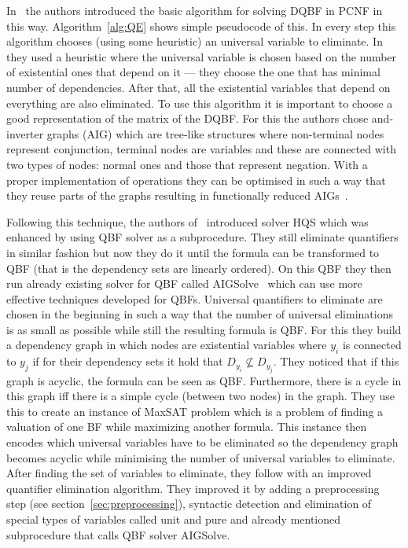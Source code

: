 \documentclass[
  digital, %
  twoside, %
  table,   %
  nolof,     %
  nolot,     %
]{fithesis3}
\theoremstyle{definition}
\theoremstyle{remark}
\begin{document}
In~\cite{HQSsimpleAlg} the authors introduced the basic algorithm for solving DQBF in PCNF in this way. %
Algorithm~\ref{alg:QE} shows simple pseudocode of this. In every step this algorithm chooses (using some heuristic) an universal variable to eliminate. In~\cite{HQSsimpleAlg} they used a heuristic where the universal variable is chosen based on the number of existential ones that depend on it --- they choose the one that has minimal number of dependencies. After that, all the existential variables that depend on everything are also eliminated. To use this algorithm it is important to choose a good representation of the matrix of the DQBF. For this the authors chose and-inverter graphs (AIG) which are tree-like structures where non-terminal nodes represent conjunction, terminal nodes are variables and these are connected with two types of nodes: normal ones and those that represent negation. With a proper implementation of operations they can be optimised in such a way that they reuse parts of the graphs resulting in functionally reduced AIGs~\cite{FRAIGs}.


Following this technique,  the authors of~\cite{HQSquantifierElimination} introduced solver HQS which was enhanced by using QBF solver as a subprocedure. They still eliminate quantifiers in similar fashion but now they do it until the formula can be transformed to QBF (that is the dependency sets are linearly ordered). On this QBF they then run already existing solver for QBF called AIGSolve~\cite{AIGSolve} which can use more effective techniques developed for QBFs. Universal quantifiers to eliminate are chosen in the beginning in such a way that the number of universal eliminations is as small as possible while still the resulting formula is QBF. For this they build a dependency graph in which nodes are existential variables where $y_i$ is connected to $y_j$ if for their dependency sets it hold that $D_{y_i} \not\subseteq D_{y_j}$. They noticed that if this graph is acyclic, the formula can be seen as QBF. Furthermore, there is a cycle in this graph iff there is a simple cycle (between two nodes) in the graph. They use this to create an instance of MaxSAT problem which is a problem of finding a valuation of one BF while maximizing another formula. This instance then encodes which universal variables have to be eliminated so the dependency graph becomes acyclic while minimising the number of universal variables to eliminate. After finding the set of variables to eliminate, they follow with an improved quantifier elimination algorithm. They improved it by adding a preprocessing step (see section~\ref{sec:preprocessing}), syntactic detection and elimination of special types of variables called unit and pure and already mentioned subprocedure that calls QBF solver AIGSolve.
\end{document}
